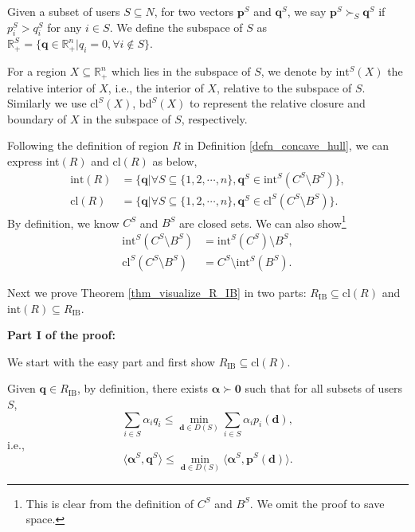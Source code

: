 \documentclass[prodmode,acmtompecs]{acmsmall}
\newcommand{\reqvec}{\mathbf{q}}
\newcommand{\concaveHull}{R}
\newcommand{\fullUserSet}{N}
\newcommand{\succS}[1]{\succ_{#1}}
\begin{document}
Given a subset of users $S \subseteq \fullUserSet$, for two vectors $\mathbf{p}^S$ and $\mathbf{q}^S$, we say $\mathbf{p}^S \succS{S} \mathbf{q}^S$ if $p_i^S > q_i^S$ for any $i \in S$. 
We define the subspace of $S$ as $\mathbb R_+^S = \{\reqvec\in \mathbb R_+^n | q_i = 0, \forall i\notin S \}$. 

For a region $X\subseteq \mathbb R_+^n$ which lies in the subspace of $S$, we denote by $\text{int}^S(X)$ the relative interior of $X$, i.e., the interior of $X$, relative to the subspace of $S$. 
Similarly we use $\text{cl}^S(X)$, $\text{bd}^S(X)$ to represent the relative closure and boundary of $X$ in the subspace of $S$, respectively. 

Following the definition of region $\concaveHull$ in Definition \ref{defn_concave_hull}, we can express int$(\concaveHull)$ and cl$(\concaveHull)$ as below, 
\begin{align}
\text{int}(\concaveHull) & = \{ \reqvec | \forall S \subseteq \{1, 2, \cdots, n\}, \reqvec^S \in \text{int}^S(C^S \setminus B^S) \}, \label{align_int_R}	\\
\text{cl}(\concaveHull) & = \{ \reqvec | \forall S \subseteq \{1, 2, \cdots, n\}, \reqvec^S \in \text{cl}^S(C^S \setminus B^S) \}. \label{align_cl_R}
\end{align}
By definition, we know $C^S$ and $B^S$ are closed sets. We can also show\footnote{This is clear from the definition of $C^S$ and $B^S$. We omit the proof to save space. }
\begin{align*}
\text{int}^S(C^S \setminus B^S) & = \text{int}^S(C^S) \setminus B^S, 	\\
\text{cl}^S(C^S \setminus B^S) & = C^S \setminus \text{int}^S(B^S). 
\end{align*}

Next we prove Theorem \ref{thm_visualize_R_IB} in two parts: $R_{\text{IB}} \subseteq \text{cl}(\concaveHull)$ and $\text{int}(\concaveHull) \subseteq R_{\text{IB}}$. 

{\bf Part I of the proof: }

We start with the easy part and first show $R_{\text{IB}} \subseteq \text{cl}(\concaveHull)$.

Given $\mathbf{q} \in R_{\text{IB}}$, by definition, there exists $\boldsymbol{\alpha} \succ \mathbf{0}$ such that for all subsets of users $S$, 
$$
\sum\limits_{i\in S}\alpha_i q_i \leq \min\limits_{\mathbf{d} \in D(S)} \sum\limits_{i\in S} \alpha_i p_i(\mathbf{d}), 
$$
i.e., 
\begin{equation}
\label{equ_alpha_S_q_S}
\langle \boldsymbol{\alpha}^S, \mathbf{q}^S \rangle \leq \min\limits_{\mathbf{d} \in D(S)} \langle \boldsymbol{\alpha}^S, \mathbf{p}^S(\mathbf{d}) \rangle. 
\end{equation}
\end{document}
